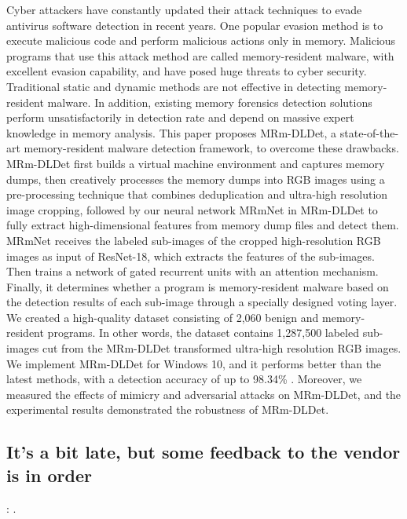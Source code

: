 \documentclass{article}
\begin{document}
Cyber attackers have constantly updated their attack techniques to evade antivirus software detection in recent years. One popular evasion method is to execute malicious code and perform malicious actions only in memory. Malicious programs that use this attack method are called memory-resident malware, with excellent evasion capability, and have posed huge threats to cyber security. Traditional static and dynamic methods are not effective in detecting memory-resident malware. In addition, existing memory forensics detection solutions perform unsatisfactorily in detection rate and depend on massive expert knowledge in memory analysis. This paper proposes MRm-DLDet, a state-of-the-art memory-resident malware detection framework, to overcome these drawbacks. MRm-DLDet first builds a virtual machine environment and captures memory dumps, then creatively processes the memory dumps into RGB images using a pre-processing technique that combines deduplication and ultra-high resolution image cropping, followed by our neural network MRmNet in MRm-DLDet to fully extract high-dimensional features from memory dump files and detect them. MRmNet receives the labeled sub-images of the cropped high-resolution RGB images as input of ResNet-18, which extracts the features of the sub-images. Then trains a network of gated recurrent units with an attention mechanism. Finally, it determines whether a program is memory-resident malware based on the detection results of each sub-image through a specially designed voting layer. We created a high-quality dataset consisting of 2,060 benign and memory-resident programs. In other words, the dataset contains 1,287,500 labeled sub-images cut from the MRm-DLDet transformed ultra-high resolution RGB images. We implement MRm-DLDet for Windows 10, and it performs better than the latest methods, with a detection accuracy of up to 98.34\% . Moreover, we measured the effects of mimicry and adversarial attacks on MRm-DLDet, and the experimental results demonstrated the robustness of MRm-DLDet.


\subsection{It's a bit late, but some feedback to the vendor is in order}

\textbf{}: \textcite{Zeng:2021}.
\end{document}

